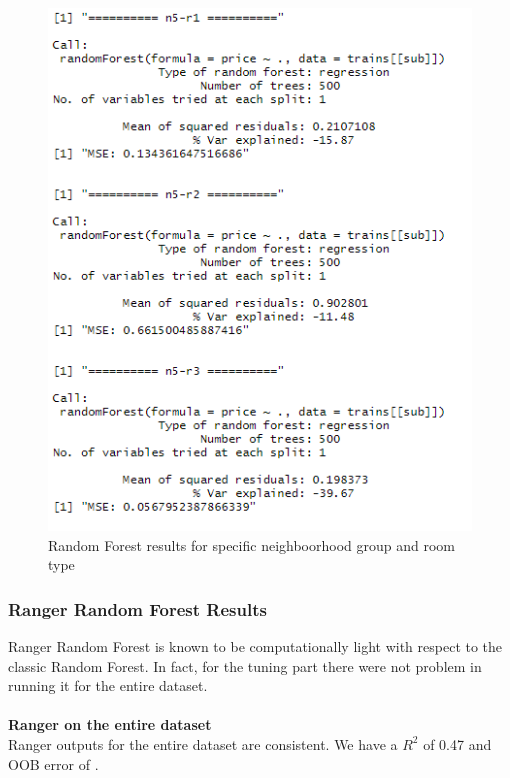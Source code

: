 \documentclass{FR16}
\begin{document}
\begin{figure}[!htb]
\begin{minipage}{0.33\textwidth}
     \includegraphics[width=1\linewidth]{figures/rf6.png}
   \end{minipage}
        \caption{Random Forest results for specific neighboorhood group and room type}\label{fig:15}

\end{figure}

\newpage
\subsubsection{Ranger Random Forest Results}
Ranger Random Forest is known to be computationally light with respect to the classic Random Forest. In fact, for the tuning part there were not problem in running it for the entire dataset. 
\\\\ \textbf{Ranger on the entire dataset }\\
Ranger outputs for the entire dataset are consistent. We have a $R^2$ of 0.47 and OOB error of .
\end{document}
